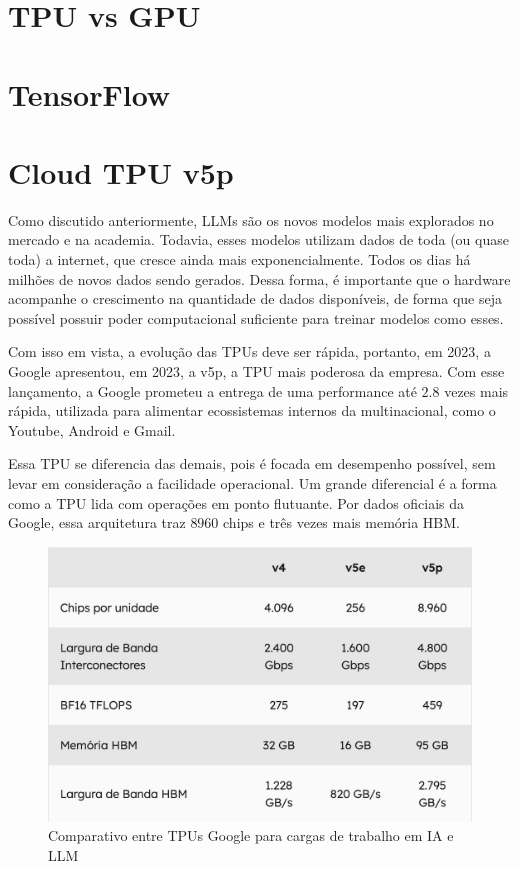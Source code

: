 \documentclass{report}
\begin{document}
\chapter{TPU vs GPU}

\chapter{TensorFlow}

\chapter{Cloud TPU v5p}

Como discutido anteriormente, LLMs são os novos modelos mais explorados no mercado e na academia. Todavia, esses modelos utilizam dados de toda (ou quase toda) a internet, que cresce ainda mais exponencialmente. Todos os dias há milhões de novos dados sendo gerados. Dessa forma, é importante que o hardware acompanhe o crescimento na quantidade de dados disponíveis, de forma que seja possível possuir poder computacional suficiente para treinar modelos como esses.

Com isso em vista, a evolução das TPUs deve ser rápida, portanto, em 2023, a Google apresentou, em 2023, a v5p, a TPU mais poderosa da empresa. Com esse lançamento, a Google prometeu a entrega de uma performance até $2.8$ vezes mais rápida, utilizada para alimentar ecossistemas internos da multinacional, como o Youtube, Android e Gmail.

Essa TPU se diferencia das demais, pois é focada em desempenho possível, sem levar em consideração a facilidade operacional. Um grande diferencial é a forma como a TPU lida com operações em ponto flutuante. Por dados oficiais da Google, essa arquitetura traz $8960$ chips e três vezes mais memória HBM.

\begin{figure}[h]
\includegraphics[scale=0.5]{comparativo-tpus}
\centering
\caption{Comparativo entre TPUs Google para cargas de trabalho em IA e LLM}
\end{figure}
\end{document}
